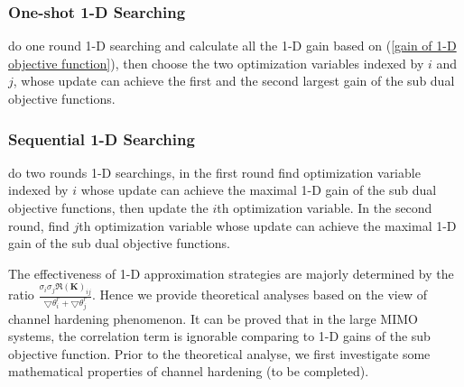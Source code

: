 \documentclass[12pt, draftclsnofoot, onecolumn]{IEEEtran}
\begin{document}
\begin{spacing}{2}
\subsubsection{ One-shot 1-D Searching}
do one round 1-D searching and calculate all the 1-D gain based on (\ref{gain of 1-D objective function}), then choose the two optimization variables indexed by $i$ and $j$, whose update can achieve the first and the second largest gain of the sub dual objective functions.
\subsubsection{ Sequential 1-D Searching}
do two rounds 1-D searchings, in the first round find optimization variable indexed by $i$ whose update can achieve the maximal 1-D gain of the sub dual objective functions, then update the $i$th optimization variable. In the second round, find $j$th optimization variable whose update can achieve the maximal 1-D gain of the sub dual objective functions.

 The effectiveness of 1-D approximation strategies are majorly determined by the ratio $\frac{\sigma_{i}\sigma_{j}\Re{(\mathbf{K})}_{ij}}{\bigtriangledown \theta^{r}_{i}+\bigtriangledown \theta^{r}_{j}}$. Hence we provide theoretical analyses based on the view of channel hardening phenomenon. It can be proved that in the large MIMO systems, the correlation term is ignorable comparing to 1-D gains of the sub objective function. Prior to the theoretical analyse, we first investigate some mathematical properties of channel hardening (to be completed).    










\end{spacing}
\end{document}
